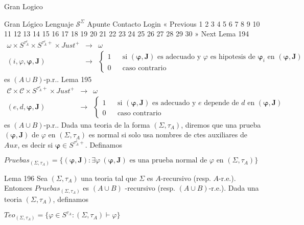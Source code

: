 Gran Logico

Gran Lógico
Lenguaje \(\mathcal{S}^{\Sigma }\)
Apunte
Contacto
Login
« Previous
1
2
3
4
5
6
7
8
9
10
11
12
13
14
15
16
17
18
19
20
21
22
23
24
25
26
27
28
29
30
» Next
Lema 194
\(\displaystyle \begin{array}{rcl} \omega \times S^{\tau _{A}^{e}}\times S^{\tau _{A}^{e}+}\times Just^{+} & \rightarrow & \omega \\ (i,\varphi ,\mathbf{\varphi },\mathbf{J}) & \rightarrow & \left\{ \begin{array}{ccl} 1 & & \text{si }(\mathbf{\varphi },\mathbf{J})\text{ es adecuado y }\varphi \text{ es hipotesis de }\mathbf{\varphi }_{i}\text{ en }(\mathbf{\varphi }, \mathbf{J}) \\ 0 & & \text{caso contrario} \end{array} \right. \end{array} \)
es \((A\cup B)\)-p.r..
Lema 195
\(\displaystyle \begin{array}{rcl} \mathcal{C}\times \mathcal{C}\times S^{\tau _{A}^{e}+}\times Just^{+} & \rightarrow & \omega \\ (e,d,\mathbf{\varphi },\mathbf{J}) & \rightarrow & \left\{ \begin{array}{ccl} 1 & & \text{si }(\mathbf{\varphi },\mathbf{J})\text{ es adecuado y }e\text{ depende de }d\text{ en }(\mathbf{\varphi },\mathbf{J}) \\ 0 & & \text{caso contrario} \end{array} \right. \end{array} \)
es \((A\cup B)\)-p.r..
Dada una teoria de la forma \((\Sigma ,\tau _{A})\), diremos que una prueba \(( \mathbf{\varphi },\mathbf{J})\) de \(\varphi \) en \((\Sigma ,\tau _{A})\) es normal si solo usa nombres de ctes auxiliares de \(Aux\), es decir si \(\mathbf{\varphi }\in S^{\tau _{A}^{e}+}\). Definamos

\(\displaystyle Pruebas_{(\Sigma ,\tau _{A})}=\{(\mathbf{\varphi },\mathbf{J}):\exists \varphi \ (\mathbf{\varphi },\mathbf{J})\text{ es una prueba normal de } \varphi \text{ en }(\Sigma ,\tau _{A})\} \)

Lema 196 Sea \((\Sigma ,\tau _{A})\) una teoria tal que \(\Sigma \) es \(A\)-recursivo (resp. \(A\)-r.e.). Entonces \(Pruebas_{(\Sigma ,\tau _{A})}\) es \((A\cup B)\) -recursivo (resp. \((A\cup B)\)-r.e.).
Dada una teoria \((\Sigma ,\tau _{A})\), definamos

\(\displaystyle Teo_{(\Sigma ,\tau _{A})}=\{\varphi \in S^{\tau _{A}}:(\Sigma ,\tau _{A})\vdash \varphi \} \)

